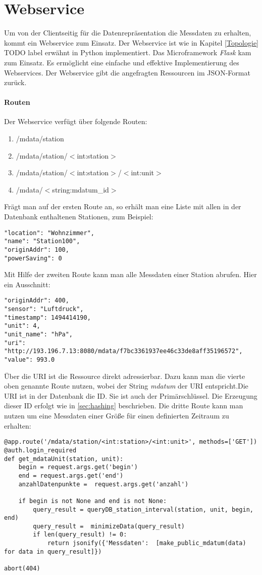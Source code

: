 \section{Webservice}
\label{sec:webservice}
Um von der Clientseitig für die Datenrepräsentation die Messdaten zu erhalten, kommt ein Webservice zum Einsatz. Der Webservice ist wie in Kapitel \ref{Topologie} TODO label erwähnt in Python implementiert. Das Microframework \textit{Flask} kam zum Einsatz. Es ermöglicht eine einfache und effektive Implementierung des Webservices. Der Webservice gibt die angefragten Ressourcen im JSON-Format zurück. 

\paragraph{Routen}
Der Webservice verfügt über folgende Routen: 
\begin{enumerate}
\item /mdata/station
\item /mdata/station/$<$int:station$>$
\item /mdata/station/$<$int:station$>$/$<$int:unit$>$
\item /mdata/$<$string:mdatum\_id$>$
\end{enumerate} 
Frägt man auf der ersten Route an, so erhält man eine Liste mit allen in der Datenbank enthaltenen Stationen, zum Beispiel:
\lstset{language=c, numbers=none, breaklines=true}
\begin{lstlisting}
"location": "Wohnzimmer", 
"name": "Station100", 
"originAddr": 100, 
"powerSaving": 0
\end{lstlisting}
Mit Hilfe der zweiten Route kann man alle Messdaten einer Station abrufen. Hier ein Ausschnitt:
\lstset{language=c, numbers=none, breaklines=true}
\begin{lstlisting}
"originAddr": 400, 
"sensor": "Luftdruck", 
"timestamp": 1494414190, 
"unit": 4, 
"unit_name": "hPa", 
"uri": "http://193.196.7.13:8080/mdata/f7bc3361937ee46c33de8aff35196572", 
"value": 993.0
\end{lstlisting}
Über die URI ist die Ressource direkt adressierbar. Dazu kann man die vierte oben genannte Route nutzen, wobei der String \textit{mdatum} der URI entspricht.Die URI ist in der Datenbank die ID. Sie ist auch der Primärschlüssel. Die Erzeugung dieser ID erfolgt wie in \ref{sec:hashing} beschrieben. 
Die dritte Route kann man nutzen um eine Messdaten einer Größe für einen definierten Zeitraum zu erhalten:
\lstset{language=python, numbers=left, breaklines=true}
\begin{lstlisting}
@app.route('/mdata/station/<int:station>/<int:unit>', methods=['GET'])
@auth.login_required
def get_mdataUnit(station, unit):
    begin = request.args.get('begin')
    end = request.args.get('end')
    anzahlDatenpunkte =  request.args.get('anzahl')

    if begin is not None and end is not None:
        query_result = queryDB_station_interval(station, unit, begin, end)
        query_result =  minimizeData(query_result)
        if len(query_result) != 0:
            return jsonify({'Messdaten':  [make_public_mdatum(data) for data in query_result]})

abort(404)
\end{lstlisting} 
